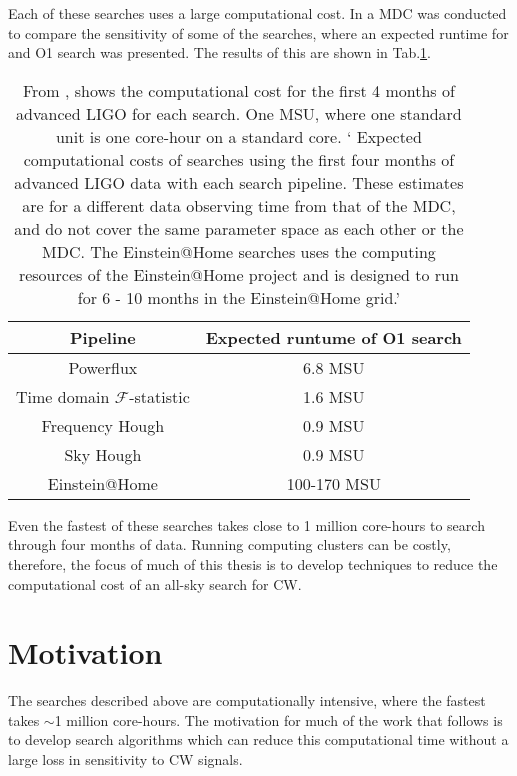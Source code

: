 Each of these searches uses a large computational cost. In \citep{walsh2016ComparisonMethods} a \ac{MDC} was conducted to compare the sensitivity of some of the searches, where an expected runtime for and O1 search was presented. 
The results of this are shown in Tab.\ref{searchcw:search:semi:cost}.
\begin{table}
	\centering
	\caption{From \citep{walsh2016ComparisonMethods}, shows the computational cost for the first 4 months of advanced \ac{LIGO} for each search. One \ac{MSU}, where one standard unit is one core-hour on a standard core. ` Expected computational costs of searches using the first four months of advanced \ac{LIGO} data with each search pipeline. These estimates are for a different data observing time from that of the \ac{MDC}, and do not cover the same parameter space as each other or the \ac{MDC}. The Einstein@Home searches uses the computing resources of the Einstein@Home project and is designed to run for 6 - 10 months in the Einstein@Home grid.'  \label{searchcw:search:semi:cost}}
	
	\bgroup
	\def\arraystretch{1.5}
	\centering
	\begin{tabular}{|c c|}
		\hline
		Pipeline & Expected runtume of O1 search \\
		\hline
		Powerflux & 6.8 MSU \\

		Time domain $\mathcal{F}$-statistic & 1.6 MSU\\

		Frequency Hough & 0.9 MSU \\

		Sky Hough & 0.9 MSU\\
		\hline
		Einstein@Home & 100-170 MSU\\
		\hline

	\end{tabular}
	\egroup
\end{table}
Even the fastest of these searches takes close to 1 million core-hours to search through four months of data.
Running computing clusters can be costly, therefore, the focus of much of this thesis is to develop techniques to reduce the computational cost of an all-sky search for \ac{CW}.


\section{\label{searchcw:motivation}Motivation}

The searches described above are computationally intensive, where the fastest takes $\sim$1 million core-hours.
The motivation for much of the work that follows is to develop search algorithms which can reduce this computational time without a large loss in sensitivity to \ac{CW} signals.

